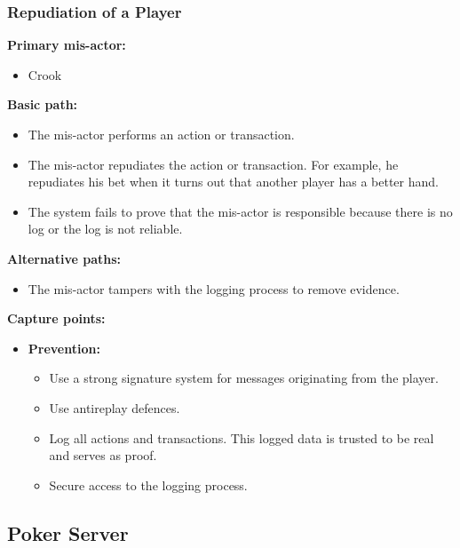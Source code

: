 \documentclass[a4paper,11pt]{report}
\begin{document}
\subsubsection{Repudiation of a Player}
\label{PlayerCasesR}
\label{Repudiation of a Player}
\textbf{Primary mis-actor:}
\begin{itemize}
\item Crook
\end{itemize}
\textbf{Basic path:}
\begin{itemize}
\item The mis-actor performs an action or transaction.
\item The mis-actor repudiates the action or transaction. For example, he repudiates his bet when it turns out that another player has a better hand.
\item The system fails to prove that the mis-actor is responsible because there is no log or the log is not reliable.
\end{itemize}
\textbf{Alternative paths:}
\begin{itemize}
\item The mis-actor tampers with the logging process to remove evidence.
\end{itemize}
\textbf{Capture points:}
\begin{itemize}
\item \textbf{Prevention:}
\begin{itemize}
\item Use a strong signature system for messages originating from the player.
\item Use antireplay defences.
\item Log all actions and transactions. This logged data is trusted to be real and serves as proof.
\item Secure access to the logging process.
\end{itemize}
\end{itemize}

\subsection{Poker Server}
\label{PokerServerCases}
\end{document}
